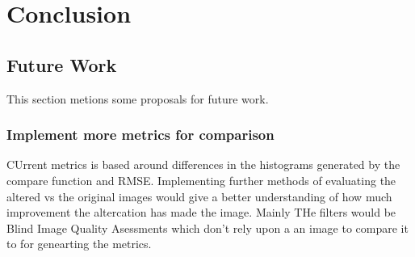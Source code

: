 \chapter{Conclusion}\label{sec:conclusion}



\section{Future Work}\label{sec:futurework}
This section metions some proposals for future work.

\subsection{Implement more metrics for comparison}
CUrrent metrics is based around differences in the histograms generated by the
compare function and RMSE.  Implementing further methods of evaluating the
altered vs the original images would give a better understanding of how much
improvement the altercation has made the image. Mainly THe filters would be
Blind Image Quality Asessments which don't rely upon a an image to compare it
to for genearting the metrics.

